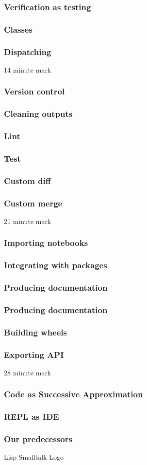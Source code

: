 \begin{frame}
\frametitle{Verification as testing}
\end{frame}

\begin{frame}
\frametitle{Classes}
\end{frame}

\begin{frame}
\frametitle{Dispatching}
\end{frame}

14 minute mark

\begin{frame}
\frametitle{Version control}
\end{frame}

\begin{frame}
\frametitle{Cleaning outputs}
\end{frame}

\begin{frame}
\frametitle{Lint}
\end{frame}

\begin{frame}
\frametitle{Test}
\end{frame}

\begin{frame}
\frametitle{Custom diff}
\end{frame}

\begin{frame}
\frametitle{Custom merge}
\end{frame}

21 minute mark

\begin{frame}
\frametitle{Importing notebooks}
\end{frame}

\begin{frame}
\frametitle{Integrating with packages}
\end{frame}

\begin{frame}
\frametitle{Producing documentation}
\end{frame}

\begin{frame}
\frametitle{Producing documentation}
\end{frame}

\begin{frame}
\frametitle{Building wheels}
\end{frame}

\begin{frame}
\frametitle{Exporting API}
\end{frame}

28 minute mark

\begin{frame}
\frametitle{Code as Successive Approximation}
\end{frame}

\begin{frame}
\frametitle{REPL as IDE}
\end{frame}

\begin{frame}
\frametitle{Our predecessors}
Lisp
Smalltalk
Logo
\end{frame}


